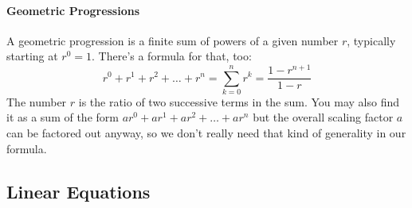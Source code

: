 





\paragraph{Geometric Progressions}
A geometric progression is a finite sum of powers of a given number $r$, typically starting at $r^0 = 1$. There's a formula for that, too:
\begin{equation}
 r^0 + r^1 + r^2 + \ldots + r^n = \sum_{k=0}^{n} r^k = \frac{1-r^{n+1}}{1 - r}
\end{equation}
The number $r$ is the ratio of two successive terms in the sum. You may also find it as a sum of the form $a r^0 + a r^1 + a r^2 + \ldots + a r^n$ but the overall scaling factor $a$ can be factored out anyway, so we don't really need that kind of generality in our formula.





\subsection{Linear Equations}


